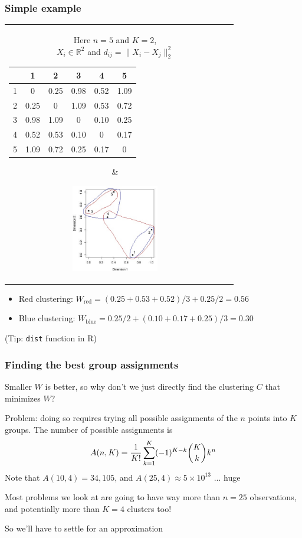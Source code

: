 \documentclass[mathserif]{beamer}
\def\R{\mathds{R}}
\def\red{\color[rgb]{0.8,0,0}}
\def\blue{\color[rgb]{0,0,0.8}}
\begin{document}
\begin{frame}
\frametitle{Simple example}
\begin{tabular}{cc}
\parbox{0.5\textwidth}{
\centering
Here $n=5$ and $K=2$,\\
$X_i \in \R^2$ and
$d_{ij}=\|X_i-X_j\|_2^2$

\bigskip
{\footnotesize
\begin{tabular}{|c|c|c|c|c|c|}
\hline
& 1 & 2 & 3 & 4 & 5 \\
\hline
1 & 0 & 0.25 & 0.98 & 0.52 & 1.09 \\
\hline
2 & 0.25 & 0 & 1.09 & 0.53 & 0.72 \\
\hline
3 & 0.98 & 1.09 & 0 & 0.10 & 0.25 \\
\hline
4 & 0.52 & 0.53 & 0.10 & 0 & 0.17 \\
\hline
5 & 1.09 & 0.72 & 0.25 & 0.17 & 0 \\
\hline
\end{tabular}}
} \hspace{5pt} & 
\parbox{0.5\textwidth}{
\includegraphics[width=0.4\textwidth]{figures/simple2.jpg}}
\end{tabular}
\begin{itemize}

\bigskip
\item {\red Red clustering}:
$W_{\text{red}}=(0.25+0.53+0.52)/3 + 0.25/2 = 0.56$
\item {\blue Blue clustering}:
$W_{\text{blue}}=0.25/2 + (0.10+0.17+0.25)/3 = 0.30$
\end{itemize}

\bigskip
(Tip: {\tt dist} function in R)
\end{frame}

\begin{frame}
\frametitle{Finding the best group assignments}
Smaller $W$ is better, so why don't we just directly
find the clustering $C$ that {\blue minimizes $W$}?

\bigskip
Problem: doing so requires trying 
{\blue all possible assignments} of the $n$ points into
$K$ groups. The number of possible assignments is
\vspace{-5pt}
$$A(n,K) = \frac{1}{K!}\sum_{k=1}^K (-1)^{K-k} 
{K \choose k} k^n
\vspace{-5pt}$$
Note that $A(10,4)=34,105$, and
$A(25,4) \approx 5 \times 10^{13}$ ... huge

\bigskip
Most problems we look at are going to have way 
more than $n=25$ observations, and potentially more
than $K=4$ clusters too! 

\bigskip
So we'll have to settle for an {\blue approximation}
\end{frame}
\end{document}
